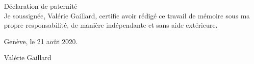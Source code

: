 
\begin{titlepage}
 \begin{center}
    \Large
    Déclaration de paternité\\





 Je soussignée, Valérie Gaillard, certifie avoir rédigé ce travail de mémoire sous ma propre responsabilité, de manière indépendante et sans aide extérieure.




 \vfill

 Genève, le 21 août 2020.


 Valérie Gaillard




	 \hfill \\
	 \rule{0mm}{0.5pt} \hfill
 \end{center}
\end{titlepage}
